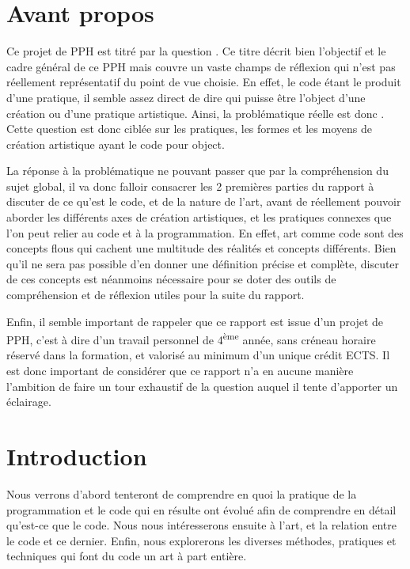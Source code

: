 \documentclass[12pt]{article} %
\newcommand{\ts}{\textsuperscript} %
\begin{document}
\section*{Avant propos}
Ce projet de PPH est titré par la question . Ce titre décrit bien l'objectif et le cadre général de ce PPH mais couvre un vaste champs de réflexion qui n'est pas réellement représentatif du point de vue choisie. En effet, le code étant le produit d'une pratique, il semble assez direct de dire qui puisse être l'object d'une création ou d'une pratique artistique. Ainsi, la problématique réelle est donc . Cette question est donc ciblée sur les pratiques, les formes et les moyens de création artistique ayant le code pour object.

La réponse à la problématique ne pouvant passer que par la compréhension du sujet global, il va donc falloir consacrer les 2 premières parties du rapport à discuter de ce qu'est le code, et de la nature de l'art, avant de réellement pouvoir aborder les différents axes de création artistiques, et les pratiques connexes que l'on peut relier au code et à la programmation. En effet, art comme code sont des concepts flous qui cachent une multitude des réalités et concepts différents. Bien qu'il ne sera pas possible d'en donner une définition précise et complète, discuter de ces concepts est néanmoins nécessaire pour se doter des outils de compréhension et de réflexion utiles pour la suite du rapport.

Enfin, il semble important de rappeler que ce rapport est issue d'un projet de PPH, c'est à dire d'un travail personnel de 4\ts{ème} année, sans créneau horaire réservé dans la formation, et valorisé au minimum d'un unique crédit ECTS. Il est donc important de considérer que ce rapport n'a en aucune manière l'ambition de faire un tour exhaustif de la question auquel il tente d'apporter un éclairage.

\newpage
\tableofcontents

\newpage
{} %

\section{Introduction}
Nous verrons d'abord tenteront de comprendre en quoi la pratique de la programmation et le code qui en résulte ont évolué afin de comprendre en détail qu'est-ce que le code. Nous nous intéresserons ensuite à l'art, et la relation entre le code et ce dernier. Enfin, nous explorerons les diverses méthodes, pratiques et techniques qui font du code un art à part entière.
\end{document}

